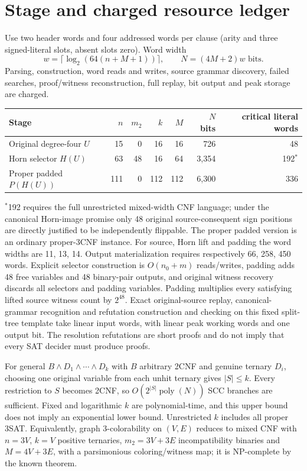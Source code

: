 \documentclass[11pt]{article}
\begin{document}
\section{Stage and charged resource ledger}
Use two header words and four addressed words per clause (arity and three signed-literal slots, absent slots zero). Word width
\[
w=\lceil\log_2(64(n+M+1))\rceil,\qquad N=(4M+2)w\text{ bits}.
\]
Parsing, construction, word reads and writes, source grammar discovery, failed searches, proof/witness reconstruction, full replay, bit output and peak storage are charged.
\begin{center}
\begin{tabular}{lrrrrrr}
\toprule Stage & $n$ & $m_2$ & $k$ & $M$ & $N$ bits & critical literal words\\
\midrule
Original degree-four $U$ &15&0&16&16&726&48\\
Horn selector $H(U)$ &63&48&16&64&3,354&192$^*$\\
Proper padded $P(H(U))$ &111&0&112&112&6,300&336\\
\bottomrule
\end{tabular}
\end{center}
$^*$192 requires the full unrestricted mixed-width CNF language; under the canonical Horn-image promise only 48 original source-consequent sign positions are directly justified to be independently flippable. The proper padded version is an ordinary proper-3CNF instance. For source, Horn lift and padding the word widths are 11, 13, 14. Output materialization requires respectively 66, 258, 450 words. Explicit selector construction is $O(n_0+m)$ reads/writes, padding adds 48 free variables and 48 binary-pair outputs, and original witness recovery discards all selectors and padding variables. Padding multiplies every satisfying lifted source witness count by $2^{48}$. Exact original-source replay, canonical-grammar recognition and refutation construction and checking on this fixed split-tree template take linear input words, with linear peak working words and one output bit. The resolution refutations are short proofs and do not imply that every SAT decider must produce proofs.

For general $B\wedge D_1\wedge\cdots\wedge D_k$ with $B$ arbitrary 2CNF and genuine ternary $D_i$, choosing one original variable from each unhit ternary gives $|S|\le k$. Every restriction to $S$ becomes 2CNF, so $O(2^{|S|}\operatorname{poly}(N))$ SCC branches are sufficient. Fixed and logarithmic $k$ are polynomial-time, and this upper bound does not imply an exponential lower bound. Unrestricted $k$ includes all proper 3SAT. Equivalently, graph 3-colorability on $(V,E)$ reduces to mixed CNF with $n=3V$, $k=V$ positive ternaries, $m_2=3V+3E$ incompatibility binaries and $M=4V+3E$, with a parsimonious coloring/witness map; it is NP-complete by the known theorem.
\end{document}
